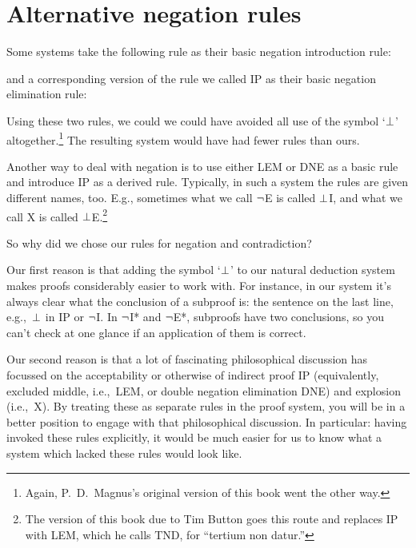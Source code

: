 \section{Alternative negation rules}
Some systems take the following rule as their basic negation introduction rule:
\begin{fitchproof}
	\open
	\close
\end{fitchproof}
and a corresponding version of the rule we called IP as their basic negation elimination rule:
\begin{fitchproof}
	\open
	\close
\end{fitchproof}
Using these two rules, we could we could have avoided all use of the symbol `$\bot$' altogether.\footnote{Again, P.~D.\ Magnus's original version of this book went the other way.} The resulting system would have had fewer rules than ours.

Another way to deal with negation is to use either LEM or DNE as a basic rule and introduce IP as a derived rule. Typically, in such a system the rules are given different names, too. E.g., sometimes what we call $\neg$E is called $\bot$I, and what we call X is called $\bot$E.\footnote{The version of this book due to Tim Button goes this route and replaces IP with LEM, which he calls TND, for ``tertium non datur.''}

So why did we chose our rules for negation and contradiction? 

Our first reason is that adding the symbol `$\bot$' to our natural deduction system makes proofs considerably easier to work with. For instance, in our system it's always clear what the conclusion of a subproof is: the sentence on the last line, e.g.,\ $\bot$ in IP or $\neg$I. In $\neg$I* and $\neg$E*, subproofs have two conclusions, so you can't check at one glance if an application of them is correct.

Our second reason is that a lot of fascinating philosophical discussion has focussed on the acceptability or otherwise of indirect proof IP (equivalently, excluded middle, i.e.,\ LEM, or double negation elimination DNE) and explosion (i.e.,\ X). By treating these as separate rules in the proof system, you will be  in a better position to engage with that philosophical discussion. In particular: having invoked these rules explicitly, it would be much easier for us to know what a system which lacked these rules would look like.

